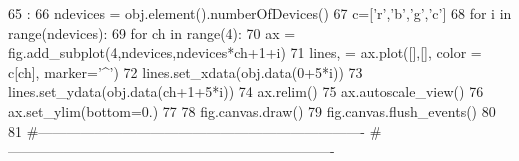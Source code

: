 \begin{DoxyCode}
65                         :
66     ndevices = obj.element().numberOfDevices()
67     c=['r','b','g','c']
68     for i in range(ndevices):
69         for ch in range(4):
70             ax = fig.add_subplot(4,ndevices,ndevices*ch+1+i)
71             lines, = ax.plot([],[], color = c[ch], marker='^')
72             lines.set_xdata(obj.data(0+5*i))
73             lines.set_ydata(obj.data(ch+1+5*i))
74             ax.relim()
75             ax.autoscale_view()
76             ax.set_ylim(bottom=0.)
77 
78     fig.canvas.draw()
79     fig.canvas.flush_events()
80 
81 #----------------------------------------------------------------------
#----------------------------------------------------------------------
\end{DoxyCode}

